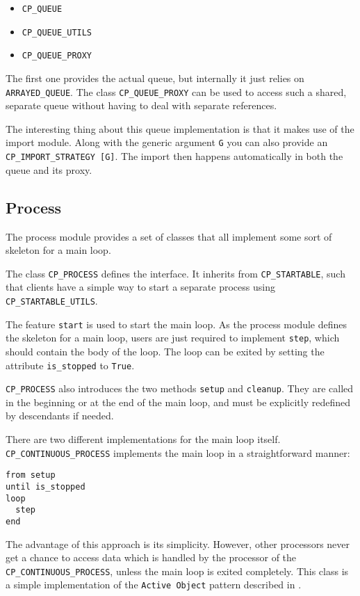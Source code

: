 \documentclass[a4paper,10pt]{report}
\begin{document}
\begin{itemize}
 \item \lstinline!CP_QUEUE!
 \item \lstinline!CP_QUEUE_UTILS!
 \item \lstinline!CP_QUEUE_PROXY!
\end{itemize}

The first one provides the actual queue, but internally it just relies on \lstinline!ARRAYED_QUEUE!.
The class \lstinline!CP_QUEUE_PROXY! can be used to access such a shared, separate queue without having to deal with separate references.

The interesting thing about this queue implementation is that it makes use of the import module.
Along with the generic argument \lstinline!G! you can also provide an \lstinline!CP_IMPORT_STRATEGY [G]!.
The import then happens automatically in both the queue and its proxy.

\subsection{Process}

The process module provides a set of classes that all implement some sort of skeleton for a main loop.

The class \lstinline!CP_PROCESS! defines the interface.
It inherits from \lstinline!CP_STARTABLE!, such that clients have a simple way to start a separate process using \lstinline!CP_STARTABLE_UTILS!.

The feature \lstinline!start! is used to start the main loop.
As the process module defines the skeleton for a main loop, users are just required to implement \lstinline!step!, which should contain the body of the loop.
The loop can be exited by setting the attribute \lstinline!is_stopped! to \lstinline!True!.

\lstinline!CP_PROCESS! also introduces the two methods \lstinline!setup! and \lstinline!cleanup!.
They are called in the beginning or at the end of the main loop, and must be explicitly redefined by descendants if needed.

There are two different implementations for the main loop itself.
\lstinline!CP_CONTINUOUS_PROCESS! implements the main loop in a straightforward manner:
\begin{lstlisting}
from setup
until is_stopped
loop
  step
end
\end{lstlisting}
The advantage of this approach is its simplicity.
However, other processors never get a chance to access data which is handled by the processor of the \lstinline!CP_CONTINUOUS_PROCESS!, unless the main loop is exited completely.
This class is a simple implementation of the \lstinline!Active Object! pattern described in .
\end{document}

